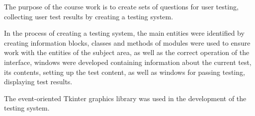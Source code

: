 The purpose of the course work is to create sets of questions for user testing, collecting user test results by creating a testing system.

In the process of creating a testing system, the main entities were identified by creating information blocks, classes and methods of modules were used to ensure work with the entities of the subject area, as well as the correct operation of the interface, windows were developed containing information about the current test, its contents, setting up the test content, as well as windows for passing testing, displaying test results.

The event-oriented Tkinter graphics library was used in the development of the testing system.
